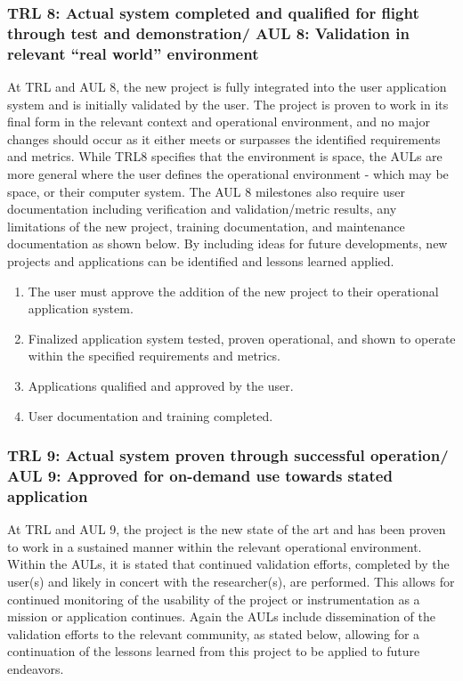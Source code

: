 \documentclass[referee,a4paper,12pt,traditabstract]{swsc}
\begin{document}
\begin{linenumbers}
\subsubsection{TRL 8: Actual system completed and qualified for flight through test and demonstration/ AUL 8: Validation in relevant ``real world'' environment}

At TRL and AUL 8, the new project is fully integrated into the user application system and is initially validated by the user. The project is proven to work in its final form in the relevant context and operational environment, and no major changes should occur as it either meets or surpasses the identified requirements and metrics. While TRL8 specifies that the environment is space, the AULs are more general where the user defines the operational environment - which may be space, or their computer system. The AUL 8 milestones also require user documentation including verification and validation/metric results, any limitations of the new project, training documentation, and maintenance documentation as shown below. By including ideas for future developments, new projects and applications can be identified and lessons learned applied. \\

\begin{enumerate}
\item The user must approve the addition of the new project to their operational application system. 
\item Finalized application system tested, proven operational, and shown to operate within the specified requirements and metrics. 
\item Applications qualified and approved by the user. 
\item User documentation and training completed. 
\end{enumerate}

\subsubsection{TRL 9: Actual system proven through successful operation/ AUL 9: Approved for on-demand use towards stated application}
At TRL and AUL 9, the project is the new state of the art and has been proven to work in a sustained manner within the relevant operational environment. Within the AULs, it is stated that continued validation efforts, completed by the user(s) and likely in concert with the researcher(s), are performed. This allows for continued monitoring of the usability of the project or instrumentation as a mission or application continues. Again the AULs include dissemination of the validation efforts to the relevant community, as stated below,  allowing for a continuation of the lessons learned from this project to be applied to future endeavors. \\


\end{linenumbers}
\end{document}
